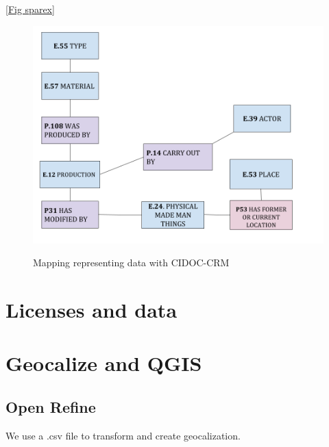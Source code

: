 \documentclass[10pt,a4paper]{article}
\begin{document}
 \ref{Fig sparex}

\begin{figure}[hdp]
\centering
\includegraphics[scale=0.50]{sparex.png}
\label{sparex}
\caption{Mapping representing data with CIDOC-CRM}
\end{figure}


\section{Licenses and data}

\section{Geocalize and QGIS}

\subsection{Open Refine}

We use a .csv file to transform and create geocalization.
\end{document}
